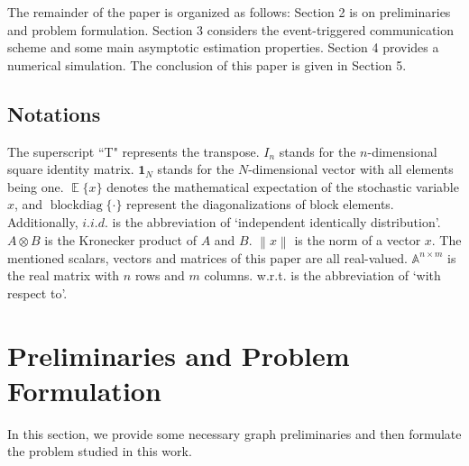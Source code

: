 \documentclass[10pt,journal,final]{IEEEtran}
\DeclareMathOperator{\blockdiag}{blockdiag}
\DeclareMathOperator{\Expect}{\mathbb{E}}
\newcommand{\norm}[1]{\left\lVert#1\right\rVert}
\theoremstyle{plain}
\theoremstyle{definition}
\theoremstyle{remark}
\begin{document}
The remainder of the paper is organized as follows: Section 2 is on preliminaries  and problem formulation. Section 3 considers the event-triggered communication scheme and  some  main asymptotic estimation properties.  Section 4 provides a numerical simulation. The conclusion of this paper is given in Section 5.

\subsection{Notations}
 The superscript ``T" represents the transpose.  $I_{n}$ stands for the $n$-dimensional square identity matrix. 
 $\textbf{1}_N$ stands for the $N$-dimensional vector with all elements being one. 
 $\Expect\{x\}$ denotes the mathematical expectation of the stochastic variable $x$, and  $\blockdiag\{\cdot\}$   represent the diagonalizations of block elements.  Additionally, $i.i.d.$ is the abbreviation of `independent identically distribution'.
$A\otimes B$ is the Kronecker product of $A$ and $B$.  $\norm{x}$ is the norm of a vector $x$.  The mentioned scalars, vectors and matrices of this paper are all real-valued. $\mathbb{A}^{n\times m}$ is the real matrix with $n$ rows and $m$ columns. w.r.t. is the abbreviation of `with respect to'.

\section{Preliminaries and Problem Formulation}
In this section, we provide some necessary graph preliminaries and then formulate the problem studied in this work.
\end{document}
